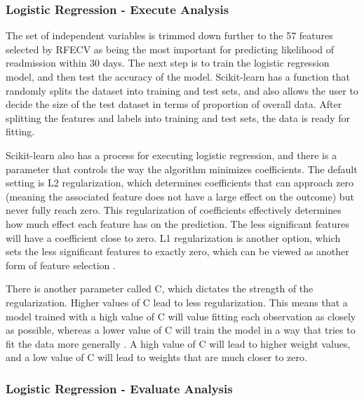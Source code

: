 \documentclass[sigconf]{acmart}
\begin{document}
\subsubsection{Logistic Regression - Execute Analysis}

The set of independent variables is trimmed down further to the 57 features selected by RFECV as being the most important for predicting likelihood of readmission within 30 days. The next step is to train the logistic regression model, and then test the accuracy of the model. Scikit-learn has a function that randomly splits the dataset into training and test sets, and also allows the user to decide the size of the test dataset in terms of proportion of overall data. After splitting the features and labels into training and test sets, the data is ready for fitting.

Scikit-learn also has a process for executing logistic regression, and there is a parameter that controls the way the algorithm minimizes coefficients. The default setting is L2 regularization, which determines coefficients that can approach zero (meaning the associated feature does not have a large effect on the outcome) but never fully reach zero. This regularization of coefficients effectively determines how much effect each feature has on the prediction. The less significant features will have a coefficient close to zero. L1 regularization is another option, which sets the less significant features to exactly zero, which can be viewed as another form of feature selection \cite{cite08}.

There is another parameter called C, which dictates the strength of the regularization. Higher values of C lead to less regularization. This means that a model trained with a high value of C will value fitting each observation as closely as possible, whereas a lower value of C will train the model in a way that tries to fit the data more generally \cite{cite08}. A high value of C will lead to higher weight values, and a low value of C will lead to weights that are much closer to zero.

\subsubsection{Logistic Regression - Evaluate Analysis}
\end{document}
